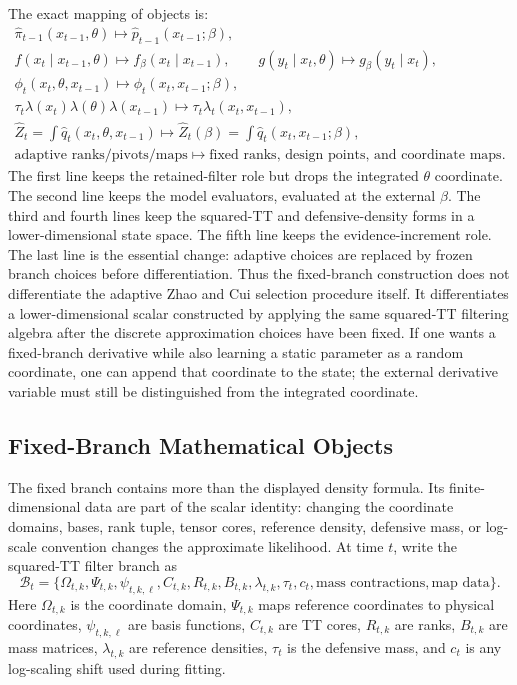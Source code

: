 \documentclass[11pt]{article}
\numberwithin{equation}{section}
\begin{document}
The exact mapping of objects is:
\begin{equation}
\begin{gathered}
\widehat\pi_{t-1}(x_{t-1},\theta)
\mapsto
\widehat p_{t-1}(x_{t-1};\beta),\\
f(x_t\mid x_{t-1},\theta)\mapsto f_\beta(x_t\mid x_{t-1}),
\qquad
g(y_t\mid x_t,\theta)\mapsto g_\beta(y_t\mid x_t),\\
\phi_t(x_t,\theta,x_{t-1})
\mapsto
\phi_t(x_t,x_{t-1};\beta),\\
\tau_t\lambda(x_t)\lambda(\theta)\lambda(x_{t-1})
\mapsto
\tau_t\lambda_t(x_t,x_{t-1}),\\
\widehat Z_t
=
\int\widehat q_t(x_t,\theta,x_{t-1})
\mapsto
\widehat Z_t(\beta)
=
\int\widehat q_t(x_t,x_{t-1};\beta),\\
\text{adaptive ranks/pivots/maps}
\mapsto
\text{fixed ranks, design points, and coordinate maps}.
\end{gathered}
\label{eq:p24-r3}
\end{equation}
The first line keeps the retained-filter role but drops the integrated
\(\theta\) coordinate.  The second line keeps the model evaluators, evaluated at
the external \(\beta\).  The third and fourth lines keep the squared-TT and
defensive-density forms in a lower-dimensional state space.  The fifth line
keeps the evidence-increment role.  The last line is the essential change:
adaptive choices are replaced by frozen branch choices before differentiation.
Thus the fixed-branch construction does not differentiate the adaptive Zhao and
Cui \cite{zhao2024ttsequential} selection procedure itself.  It differentiates a
lower-dimensional scalar constructed by applying the same squared-TT filtering
algebra after the discrete approximation choices have been fixed.  If one wants
a fixed-branch derivative while also learning a static parameter as a random
coordinate, one can append that coordinate to the state; the external
derivative variable must still be distinguished from the integrated coordinate.

\subsection{Fixed-Branch Mathematical Objects}

The fixed branch contains more than the displayed density formula.  Its
finite-dimensional data are part of the scalar identity: changing the coordinate
domains, bases, rank tuple, tensor cores, reference density, defensive mass, or
log-scale convention changes the approximate likelihood.  At time \(t\), write
the squared-TT filter branch as
\[
    \mathcal B_t
    =
    \{
    \Omega_{t,k},\Psi_{t,k},\psi_{t,k,\ell},C_{t,k},
    R_{t,k},B_{t,k},\lambda_{t,k},\tau_t,c_t,
    \text{mass contractions},\text{map data}
    \}.
\]
Here \(\Omega_{t,k}\) is the coordinate domain, \(\Psi_{t,k}\) maps reference
coordinates to physical coordinates, \(\psi_{t,k,\ell}\) are basis functions,
\(C_{t,k}\) are TT cores, \(R_{t,k}\) are ranks, \(B_{t,k}\) are mass matrices,
\(\lambda_{t,k}\) are reference densities, \(\tau_t\) is the defensive mass, and
\(c_t\) is any log-scaling shift used during fitting.
\end{document}
